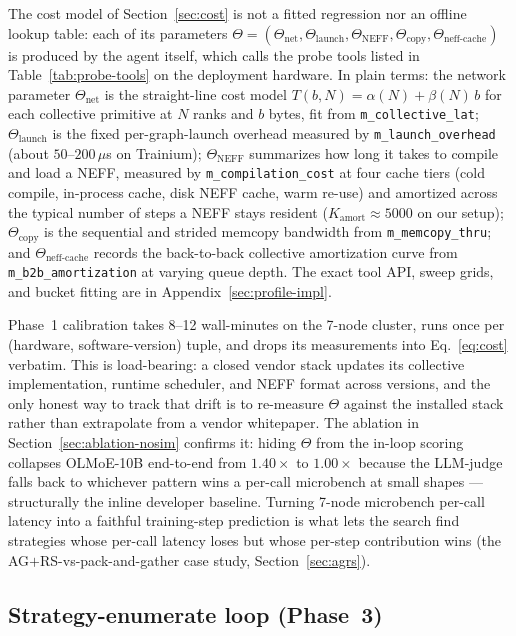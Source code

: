 The cost model of Section~\ref{sec:cost} is not a fitted
regression nor an offline lookup table: each of its parameters
$\Theta = (\Theta_{\text{net}}, \Theta_{\text{launch}},
\Theta_{\text{NEFF}}, \Theta_{\text{copy}},
\Theta_{\text{neff-cache}})$ is produced by the agent itself,
which calls the probe tools listed in
Table~\ref{tab:probe-tools} on the deployment hardware. In plain
terms: the network parameter $\Theta_{\text{net}}$ is the
straight-line cost model
$T(b,N){=}\alpha(N){+}\beta(N)\,b$ for each collective primitive
at $N$ ranks and $b$ bytes, fit from
\texttt{m\_collective\_lat}; $\Theta_{\text{launch}}$ is the
fixed per-graph-launch overhead measured by
\texttt{m\_launch\_overhead} (about $50$--$200\,\mu$s on
Trainium); $\Theta_{\text{NEFF}}$ summarizes how long it takes
to compile and load a NEFF, measured by
\texttt{m\_compilation\_cost} at four cache tiers (cold compile,
in-process cache, disk NEFF cache, warm re-use) and amortized
across the typical number of steps a NEFF stays resident
($K_{\text{amort}}{\approx}5000$ on our setup);
$\Theta_{\text{copy}}$ is the sequential and strided memcopy
bandwidth from \texttt{m\_memcopy\_thru}; and
$\Theta_{\text{neff-cache}}$ records the back-to-back collective
amortization curve from \texttt{m\_b2b\_amortization} at varying
queue depth.
The exact tool API, sweep grids, and bucket fitting are in
Appendix~\ref{sec:profile-impl}.

Phase~1 calibration takes 8--12 wall-minutes on the 7-node
cluster, runs once per (hardware, software-version) tuple, and
drops its measurements into Eq.~\ref{eq:cost} verbatim. This is
load-bearing: a closed vendor stack updates its collective
implementation, runtime scheduler, and NEFF format across
versions, and the only honest way to track that drift is to
re-measure $\Theta$ against the installed stack rather than
extrapolate from a vendor whitepaper. The ablation in
Section~\ref{sec:ablation-nosim} confirms it: hiding $\Theta$
from the in-loop scoring collapses OLMoE-10B end-to-end from
$1.40\times$ to $1.00\times$ because the LLM-judge falls back to
whichever pattern wins a per-call microbench at small shapes ---
structurally the inline developer baseline. Turning 7-node
microbench per-call latency into a faithful training-step
prediction is what lets the search find strategies whose
per-call latency loses but whose per-step contribution wins (the
AG$+$RS-vs-pack-and-gather case study, Section~\ref{sec:agrs}).

\subsection{Strategy-enumerate loop (Phase~3)}
\label{sec:strat-enum}

